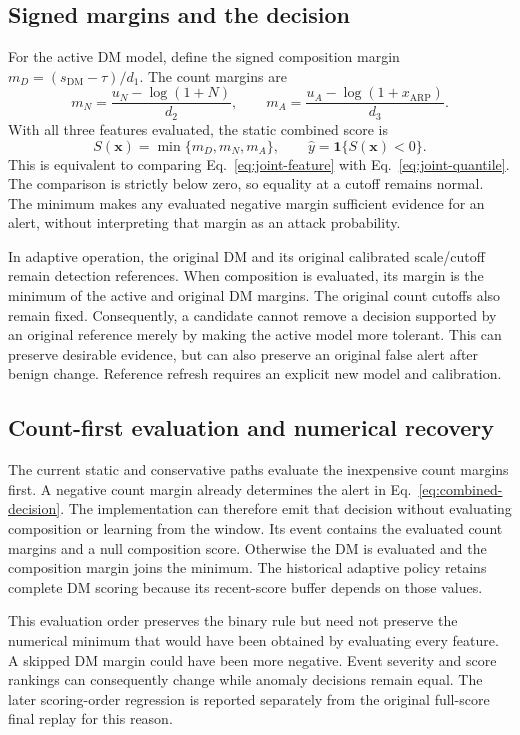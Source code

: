 \subsection{Signed margins and the decision}

For the active DM model, define the signed composition margin
$m_D=(s_{\mathrm{DM}}-\tau)/d_1$. The count margins are
\[
 m_N=\frac{u_N-\log(1+N)}{d_2},\qquad
 m_A=\frac{u_A-\log(1+x_{\mathrm{ARP}})}{d_3}.
\]
With all three features evaluated, the static combined score is
\begin{equation}
 S(\boldsymbol{x})=\min\{m_D,m_N,m_A\},
 \qquad \widehat y=\mathbf{1}\{S(\boldsymbol{x})<0\}.
\label{eq:combined-decision}
\end{equation}
This is equivalent to comparing Eq.~\eqref{eq:joint-feature} with
Eq.~\eqref{eq:joint-quantile}. The comparison is strictly below zero, so
equality at a cutoff remains normal. The minimum makes any evaluated
negative margin sufficient evidence for an alert, without interpreting
that margin as an attack probability.

In adaptive operation, the original DM and its original calibrated
scale/cutoff remain detection references. When composition is evaluated,
its margin is the minimum of the active and original DM margins.
The original count cutoffs also remain fixed. Consequently, a candidate
cannot remove a decision supported by an original reference merely by
making the active model more tolerant. This can preserve desirable
evidence, but can also preserve an original false alert after benign
change. Reference refresh requires an explicit new model and calibration.

\subsection{Count-first evaluation and numerical recovery}

The current static and conservative paths evaluate the inexpensive count
margins first. A negative count margin already determines the alert in
Eq.~\eqref{eq:combined-decision}. The implementation can therefore emit
that decision without evaluating composition or learning from the window.
Its event contains the evaluated count margins and a null composition
score. Otherwise the DM is evaluated and the composition margin joins
the minimum. The historical adaptive policy retains complete DM scoring
because its recent-score buffer depends on those values.

This evaluation order preserves the binary rule but need not preserve the
numerical minimum that would have been obtained by evaluating every
feature. A skipped DM margin could have been more negative. Event severity
and score rankings can consequently change while anomaly decisions remain
equal. The later scoring-order regression is reported separately from
the original full-score final replay for this reason.

